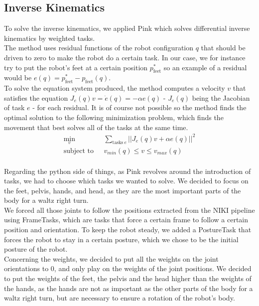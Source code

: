 \documentclass{amsart}
\theoremstyle{definition}
\theoremstyle{plain}
\begin{document}
\subsection{Inverse Kinematics}
To solve the inverse kinematics, we applied Pink\cite{pink2024} which solves differential inverse kinematics by weighted tasks. \\

The method uses residual functions of the robot configuration $q$ that should be driven to zero to make the robot do a certain task. In our case, we for instance try to put the robot's feet at a certain position $p_{\text{feet}}^*$ so an example of a residual would be $e(q) = p_{\text{feet}}^* - p_{\text{feet}}(q)$. \\

To solve the equation system produced, the method computes a velocity $v$ that satisfies the equation $J_e(q)v = \dot{e}(q) = -\alpha e(q)$ - $J_e(q)$ being the Jacobian of task $e$ - for each residual. 
It is of course not possible so the method finds the optimal solution to the following minimization problem, which finds the movement that best solves all of the tasks at the same time.
$$
\begin{aligned}
\min_v \ \ &\sum_{\text{tasks} \ e} ||J_e(q)v + \alpha e(q)||^2 \\
\text{subject to} \ \ \ &v_{min}(q) \leq v \leq v_{max}(q)
\end{aligned}
$$\\

Regarding the python side of things, as Pink revolves around the introduction of tasks, we had to choose which tasks we wanted to solve. We decided to focus on the feet, pelvis, hands, and head, as they are the most important parts of the body for a waltz right turn. \\

We forced all those joints to follow the positions extracted from the NIKI pipeline using FrameTasks, which are tasks that force a certain frame to follow a certain position and orientation. To keep the robot steady, we added a PostureTask that forces the robot to stay in a certain posture, which we chose to be the initial posture of the robot.\\

Concerning the weights, we decided to put all the weights on the joint orientations to 0, and only play on the weights of the joint positions. We decided to put the weights of the feet, the pelvis and the head higher than the weights of the hands, as the hands are not as important as the other parts of the body for a waltz right turn, but are necessary to ensure a rotation of the robot's body.
\end{document}
